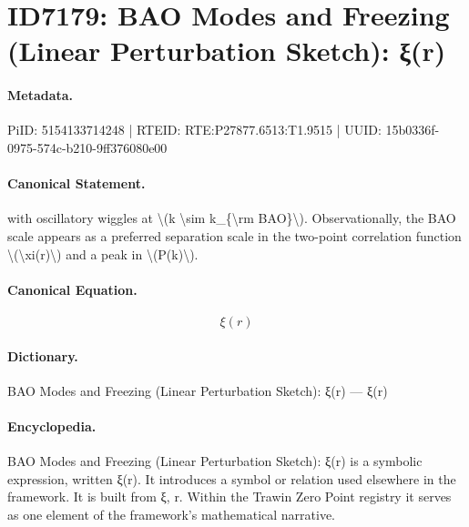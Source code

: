 \section*{ID7179: BAO Modes and Freezing (Linear Perturbation Sketch): ξ(r)}
\paragraph{Metadata.}
PiID: 5154133714248 | RTEID: RTE:P27877.6513:T1.9515 | UUID: 15b0336f-0975-574c-b210-9ff376080e00

\paragraph{Canonical Statement.}
with oscillatory wiggles at \textbackslash{}(k \textbackslash{}sim k\_\{\textbackslash{}rm BAO\}\textbackslash{}). Observationally, the BAO scale appears as a preferred separation scale in the two-point correlation function \textbackslash{}(\textbackslash{}xi(r)\textbackslash{}) and a peak in \textbackslash{}(P(k)\textbackslash{}).

\paragraph{Canonical Equation.}
\[
\xi(r)
\]

\paragraph{Dictionary.}
BAO Modes and Freezing (Linear Perturbation Sketch): ξ(r) — ξ(r)

\paragraph{Encyclopedia.}
BAO Modes and Freezing (Linear Perturbation Sketch): ξ(r) is a symbolic expression, written ξ(r). It introduces a symbol or relation used elsewhere in the framework. It is built from ξ, r. Within the Trawin Zero Point registry it serves as one element of the framework's mathematical narrative.
